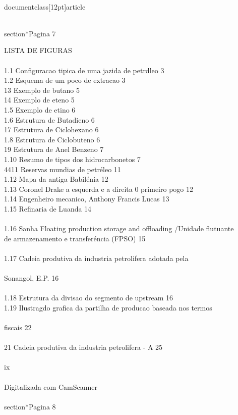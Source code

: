 \\documentclass[12pt]{article}
\begin{document}
\\section*{Pagina 7}

LISTA DE FIGURAS\\
\\
1.1 Configuracao tipica de uma jazida de petrdleo 3\\
1.2 Esquema de um poco de extracao 3\\
13 Exemplo de butano 5\\
14 Exemplo de eteno 5\\
1.5 Exemplo de etino 6\\
1.6 Estrutura de Butadieno 6\\
17 Estrutura de Ciclohexano 6\\
1.8 Estrutura de Ciclobuteno 6\\
19 Estrutura de Anel Benzeno 7\\
1.10 Resumo de tipos dos hidrocarbonetos 7\\
4411 Reservas mundias de petréleo 11\\
1.12 Mapa da antiga Babilénia 12\\
1.13 Coronel Drake a esquerda e a direita 0 primeiro pogo 12\\
1.14 Engenheiro mecanico, Anthony Francis Lucas 13\\
1.15 Refinaria de Luanda 14\\
\\
1.16 Sanha Floating production storage and offloading /Unidade flutuante\\
de armazenamento e transferéncia (FPSO) 15\\
\\
1.17 Cadeia produtiva da industria petrolifera adotada pela\\
\\
Sonangol, E.P. 16\\
\\
1.18 Estrutura da divisao do segmento de upstream 16\\
1.19 Ilustragdo grafica da partilha de producao baseada nos termos\\
\\
fiscais 22\\
\\
21 Cadeia produtiva da industria petrolifera - A 25\\
\\
ix\\
\\
Digitalizada com CamScanner\\

\\section*{Pagina 8}
\end{document}
